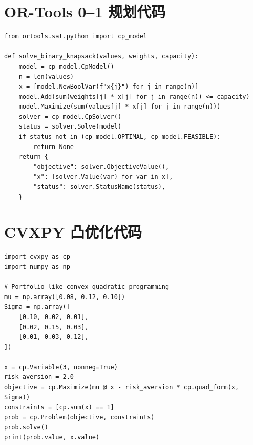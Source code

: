 \documentclass[11pt,a4paper]{ctexart}
\begin{document}
\section{OR-Tools 0--1 规划代码}
\begin{lstlisting}
from ortools.sat.python import cp_model

def solve_binary_knapsack(values, weights, capacity):
    model = cp_model.CpModel()
    n = len(values)
    x = [model.NewBoolVar(f"x{j}") for j in range(n)]
    model.Add(sum(weights[j] * x[j] for j in range(n)) <= capacity)
    model.Maximize(sum(values[j] * x[j] for j in range(n)))
    solver = cp_model.CpSolver()
    status = solver.Solve(model)
    if status not in (cp_model.OPTIMAL, cp_model.FEASIBLE):
        return None
    return {
        "objective": solver.ObjectiveValue(),
        "x": [solver.Value(var) for var in x],
        "status": solver.StatusName(status),
    }
\end{lstlisting}

\section{CVXPY 凸优化代码}
\begin{lstlisting}
import cvxpy as cp
import numpy as np

# Portfolio-like convex quadratic programming
mu = np.array([0.08, 0.12, 0.10])
Sigma = np.array([
    [0.10, 0.02, 0.01],
    [0.02, 0.15, 0.03],
    [0.01, 0.03, 0.12],
])

x = cp.Variable(3, nonneg=True)
risk_aversion = 2.0
objective = cp.Maximize(mu @ x - risk_aversion * cp.quad_form(x, Sigma))
constraints = [cp.sum(x) == 1]
prob = cp.Problem(objective, constraints)
prob.solve()
print(prob.value, x.value)
\end{lstlisting}
\end{document}
